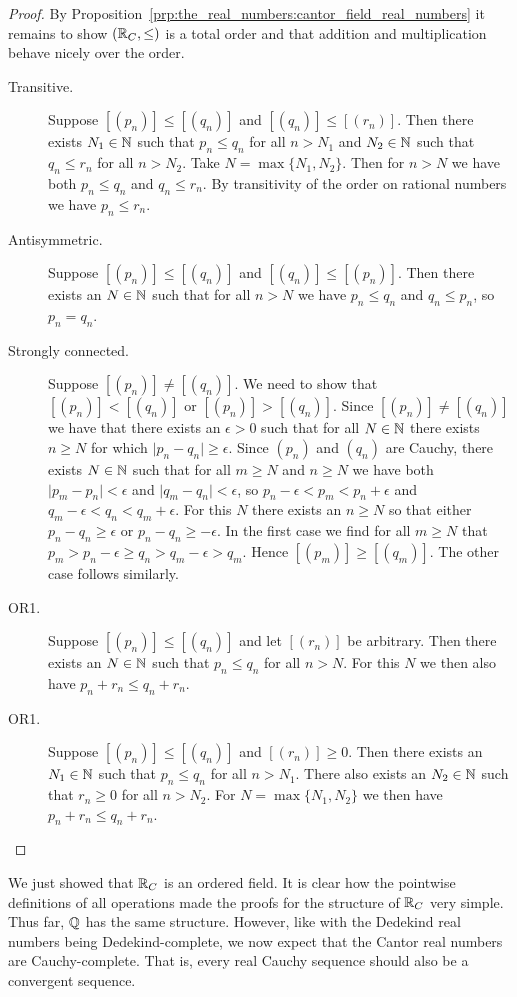 \documentclass[../main.tex]{subfiles}
\begin{document}
\begin{proof}
    By Proposition~\ref{prp:the_real_numbers:cantor_field_real_numbers} it remains to show $(\mathbb{R}_C,\leq)$ is a total order and that addition and multiplication behave nicely over the order.
    \begin{description}
        \item[Transitive.] Suppose $[(p_n)]\leq[(q_n)]$ and $[(q_n)]\leq[(r_n)]$. Then there exists $N_1\in\mathbb{N}$ such that $p_n\leq q_n$ for all $n>N_1$ and $N_2\in\mathbb{N}$ such that $q_n\leq r_n$ for all $n>N_2$. Take $N=\max\{N_1,N_2\}$. Then for $n>N$ we have both $p_n\leq q_n$ and $q_n\leq r_n$. By transitivity of the order on rational numbers we have $p_n\leq r_n$.
        \item[Antisymmetric.] Suppose $[(p_n)]\leq[(q_n)]$ and $[(q_n)]\leq[(p_n)]$. Then there exists an $N\in\mathbb{N}$ such that for all $n>N$ we have $p_n\leq q_n$ and $q_n\leq p_n$, so $p_n=q_n$.
        \item[Strongly connected.] Suppose $[(p_n)]\neq[(q_n)]$. We need to show that $[(p_n)]<[(q_n)]$ or $[(p_n)]>[(q_n)]$. Since $[(p_n)]\neq[(q_n)]$ we have that there exists an $\epsilon>0$ such that for all $N\in\mathbb{N}$ there exists $n\geq N$ for which $\vert p_n-q_n\vert\geq\epsilon$. Since $(p_n)$ and $(q_n)$ are Cauchy, there exists $N\in\mathbb{N}$ such that for all $m\geq N$ and $n\geq N$ we have both $\vert p_m-p_n\vert<\epsilon$ and $\vert q_m-q_n\vert<\epsilon$, so $p_n-\epsilon<p_m<p_n+\epsilon$ and $q_m-\epsilon<q_n<q_m+\epsilon$. For this $N$ there exists an $n\geq N$ so that either $p_n-q_n\geq\epsilon$ or $p_n-q_n\geq-\epsilon$. In the first case we find for all $m\geq N$ that $p_m>p_n-\epsilon\geq q_n>q_m-\epsilon>q_m$. Hence $[(p_m)]\geq[(q_m)]$. The other case follows similarly.
        \item[OR1.] Suppose $[(p_n)]\leq[(q_n)]$ and let $[(r_n)]$ be arbitrary. Then there exists an $N\in\mathbb{N}$ such that $p_n\leq q_n$ for all $n>N$. For this $N$ we then also have $p_n+r_n\leq q_n+r_n$.
        \item[OR1.] Suppose $[(p_n)]\leq[(q_n)]$ and $[(r_n)]\geq0$. Then there exists an $N_1\in\mathbb{N}$ such that $p_n\leq q_n$ for all $n>N_1$. There also exists an $N_2\in\mathbb{N}$ such that $r_n\geq0$ for all $n>N_2$. For $N=\max\{N_1,N_2\}$ we then have $p_n+r_n\leq q_n+r_n$.
    \end{description}
\end{proof}
We just showed that $\mathbb{R}_C$ is an ordered field. It is clear how the pointwise definitions of all operations made the proofs for the structure of $\mathbb{R}_C$ very simple. Thus far, $\mathbb{Q}$ has the same structure. However, like with the Dedekind real numbers being Dedekind-complete, we now expect that the Cantor real numbers are Cauchy-complete. That is, every real Cauchy sequence should also be a convergent sequence. 
\end{document}
